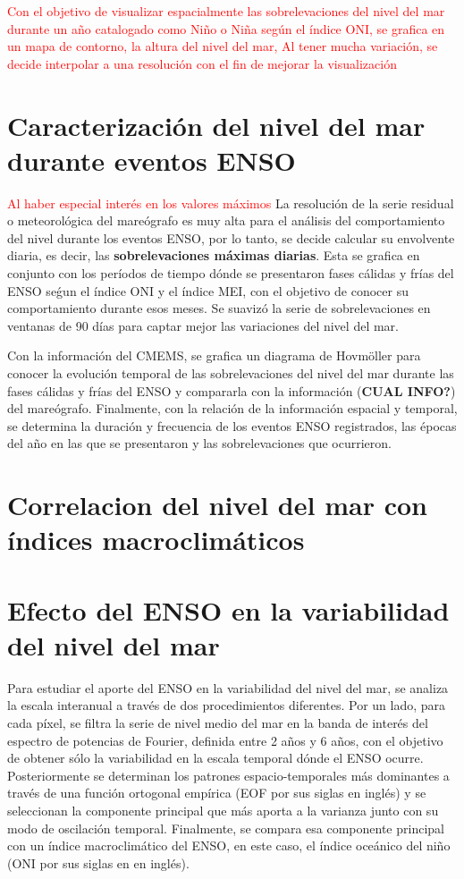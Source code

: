 \textcolor{red}{Con el objetivo de visualizar espacialmente las sobrelevaciones del nivel del mar durante un año catalogado como Niño o Niña según el índice ONI, se grafica en un mapa de contorno, la altura del nivel del mar, Al tener mucha variación, se decide interpolar a una resolución con el fin de mejorar la visualización}

\section{Caracterización del nivel del mar durante eventos ENSO}

\textcolor{red}{Al haber especial interés en los valores máximos }La resolución de la serie residual o meteorológica del mareógrafo es muy alta para el análisis del comportamiento del nivel durante los eventos ENSO, por lo tanto, se decide calcular su envolvente diaria, es decir, las \textbf{sobrelevaciones máximas diarias}. Esta se grafica en conjunto con los períodos de tiempo dónde se presentaron fases cálidas y frías del ENSO seǵun el índice ONI y el índice MEI, con el objetivo de conocer su comportamiento durante esos meses. Se suavizó la serie de sobrelevaciones en ventanas de 90 días para captar mejor las variaciones del nivel del mar.

Con la información del CMEMS, se grafica un diagrama de Hovmöller para conocer la evolución temporal de las sobrelevaciones del nivel del mar durante las fases cálidas y frías del ENSO y compararla con la información (\textbf{CUAL INFO?}) del mareógrafo. Finalmente, con la relación de la información espacial y temporal, se determina la duración y frecuencia de los eventos ENSO registrados, las épocas del año en las que se presentaron y las sobrelevaciones que ocurrieron. 

\section{Correlacion del nivel del mar con índices macroclimáticos}

\section{Efecto del ENSO en la variabilidad del nivel del mar}
	
Para estudiar el aporte del ENSO en la variabilidad del nivel del mar, se analiza la escala interanual a través de dos procedimientos diferentes. Por un lado, para cada píxel, se filtra la serie de nivel medio del mar en la banda de interés del espectro de potencias de Fourier, definida entre 2 años y 6 años, con el objetivo de obtener sólo la variabilidad en la escala temporal dónde el ENSO ocurre. Posteriormente se determinan los patrones espacio-temporales  más dominantes a través de una función ortogonal empírica (EOF por sus siglas en inglés) y se seleccionan la componente principal que más aporta a la varianza junto con su modo de oscilación temporal. Finalmente, se compara esa componente principal con un índice macroclimático del ENSO, en este caso, el índice oceánico del niño (ONI por sus siglas en en inglés). 

